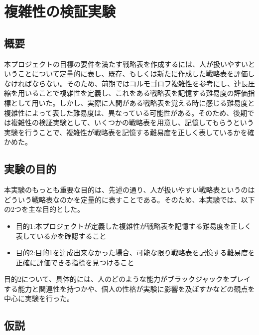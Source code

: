 \section{複雑性の検証実験}

\subsection{概要}

本プロジェクトの目標の要件を満たす戦略表を作成するには、人が扱いやすいということについて定量的に表し、既存、もしくは新たに作成した戦略表を評価しなければならない。そのため、前期ではコルモゴロフ複雑性を参考にし、連長圧縮を用いることで複雑性を定義し、これをある戦略表を記憶する難易度の評価指標として用いた。しかし、実際に人間がある戦略表を覚える時に感じる難易度と複雑性によって表した難易度は、異なっている可能性がある。そのため、後期では複雑性の検証実験として、いくつかの戦略表を用意し、記憶してもらうという実験を行うことで、複雑性が戦略表を記憶する難易度を正しく表しているかを確かめた。

\subsection{実験の目的}

本実験のもっとも重要な目的は、先述の通り、人が扱いやすい戦略表というのはどういう戦略表なのかを定量的に表すことである。そのため、本実験では、以下の2つを主な目的とした。
\begin{itemize}
    \item 目的1:本プロジェクトが定義した複雑性が戦略表を記憶する難易度を正しく表しているかを確認すること
    \item 目的2:目的1を達成出来なかった場合、可能な限り戦略表を記憶する難易度を正確に評価できる指標を見つけること
\end{itemize}
目的2について、具体的には、人のどのような能力がブラックジャックをプレイする能力と関連性を持つかや、個人の性格が実験に影響を及ぼすかなどの観点を中心に実験を行った。

\subsection{仮説}

